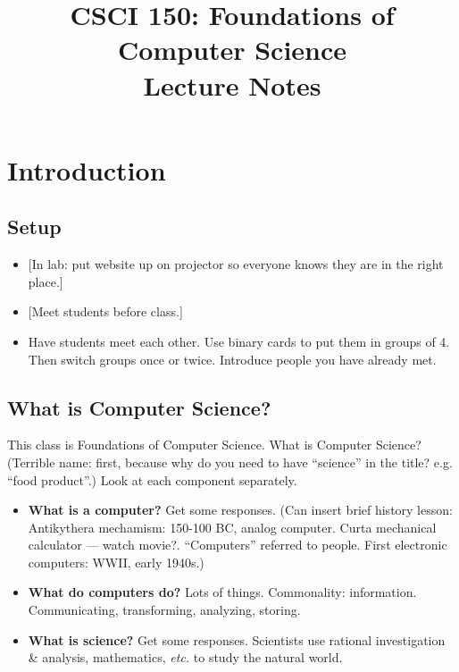 \documentclass{article}
\newcommand{\etc}{\emph{etc.}\xspace}
\begin{document}
\title{CSCI 150: Foundations of Computer Science \\ Lecture Notes}

\maketitle

\section{Introduction}

\subsection*{Setup}

\begin{itemize}
\item {}[In lab: put website up on projector so everyone knows they are
  in the right place.]
\item {}[Meet students before class.]
\item Have students meet each other. Use binary cards to put them in
  groups of 4.  Then switch groups once or twice.  Introduce people
  you have already met.
\end{itemize}

\subsection*{What is Computer Science?}

This class is Foundations of Computer Science.  What is Computer
Science?  (Terrible name: first, because why do you need to have
``science'' in the title?  e.g. ``food product''.)  Look at each
component separately.
\begin{itemize}
\item \textbf{What is a computer?}  Get some responses.  (Can insert
  brief history lesson: Antikythera mechamism: 150-100 BC, analog
  computer.  Curta mechanical calculator --- watch
  movie?. ``Computers'' referred to people.  First electronic
  computers: WWII, early 1940s.)
\item \textbf{What do computers do?}  Lots of things.  Commonality:
  information.  Communicating, transforming, analyzing, storing.
\item \textbf{What is science?}  Get some responses.  Scientists use
  rational investigation \& analysis, mathematics, \etc to study the
  natural world.
\end{itemize}
\end{document}
